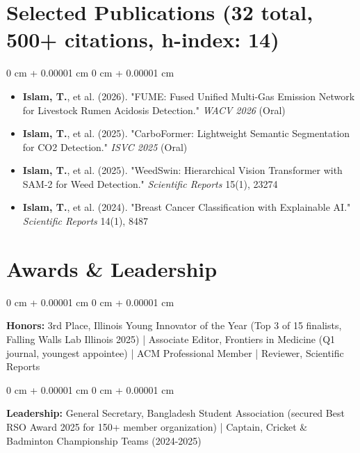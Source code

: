 \documentclass[9pt, letterpaper]{article}
\newenvironment{highlights}{
    \begin{itemize}[
        topsep=0.05 cm,
        parsep=0.05 cm,
        partopsep=0pt,
        itemsep=0pt,
        leftmargin=0 cm + 10pt
    ]
}{
    \end{itemize}
} %
\newenvironment{onecolentry}{
    \begin{adjustwidth}{
        0 cm + 0.00001 cm
    }{
        0 cm + 0.00001 cm
    }
}{
    \end{adjustwidth}
} %
\begin{document}
\section{Selected Publications (32 total, 500+ citations, h-index: 14)}
\begin{onecolentry}
    \begin{highlights}
            \item \textbf{Islam, T.}, et al. (2026). "FUME: Fused Unified Multi-Gas Emission Network for Livestock Rumen Acidosis Detection." \textit{WACV 2026} (Oral)
        \item \textbf{Islam, T.}, et al. (2025). "CarboFormer: Lightweight Semantic Segmentation for CO2 Detection." \textit{ISVC 2025} (Oral)
        
        \item \textbf{Islam, T.}, et al. (2025). "WeedSwin: Hierarchical Vision Transformer with SAM-2 for Weed Detection." \textit{Scientific Reports} 15(1), 23274
        
        \item \textbf{Islam, T.}, et al. (2024). "Breast Cancer Classification with Explainable AI." \textit{Scientific Reports} 14(1), 8487
    \end{highlights}
\end{onecolentry}
    
\section{Awards \& Leadership}
        \begin{onecolentry}
            \textbf{Honors:} 3rd Place, Illinois Young Innovator of the Year (Top 3 of 15 finalists, Falling Walls Lab Illinois 2025) | Associate Editor, Frontiers in Medicine (Q1 journal, youngest appointee) | ACM Professional Member | Reviewer, Scientific Reports
        \end{onecolentry}
        \vspace{0.05 cm}
        \begin{onecolentry}
            \textbf{Leadership:} General Secretary, Bangladesh Student Association (secured Best RSO Award 2025 for 150+ member organization) | Captain, Cricket \& Badminton Championship Teams (2024-2025)
        \end{onecolentry}
\end{document}
